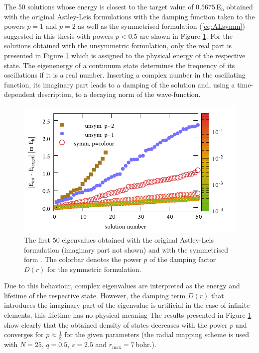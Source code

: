 The 50 solutions whose energy is closest to the target value of $0.5675\,$E$_\text{h}$ obtained with the original Astley-Leis formulations with the damping function taken to the powers $p=1$ and $p=2$ as well as the symmetrised formulation (\ref{eq:ALsymm}) suggested in this thesis with powers $p<0.5$ are shown in Figure \ref{fig:IFEMform_spect}.
For the solutions obtained with the unsymmetric formulation, only the real part is presented in Figure \ref{fig:IFEMform_spect} which is assigned to the physical energy of the respective state.
The eigenenergy of a continuum state determines the frequency of its oscillations if it is a real number.
Inserting a complex number in the oscillating function, its imaginary part leads to a damping of the solution and, using a time-dependent description, to a decaying norm of the wave-function.
\begin{figure}[h]
\includegraphics[width=\textwidth]{Figures/IFem_form_spectra}
\caption{The first 50 eigenvalues obtained with the original Astley-Leis formulation (imaginary part not shown) and with the symmetrised form .
The colorbar denotes the power $p$ of the damping factor $D(r)$ for the symmetric formulation.}
\label{fig:IFEMform_spect}
\end{figure}
Due to this behaviour, complex eigenvalues are interpreted as the energy and lifetime of the respective state.
However, the damping term $D(r)$ that introduces the imaginary part of the eigenvalue is artificial in the case of infinite elements, this lifetime has no physical meaning 
The results presented in Figure \ref{fig:IFEMform_spect} show clearly that the obtained density of states decreases with the power $p$ and converges for $p\approx \frac 18$ for the given parameters (the radial mapping scheme  is used with $N=25$, $q=0.5$, $s=2.5$ and $r_\text{max}=7\,$bohr.).

